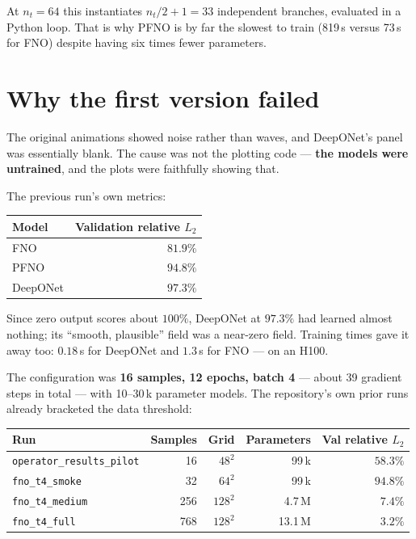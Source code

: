 \documentclass[11pt,a4paper]{article}
\newcommand{\relL}{relative $L_2$}
\begin{document}
At $n_t=64$ this instantiates $n_t/2+1=33$ independent branches, evaluated in a
Python loop. That is why PFNO is by far the slowest to train (819\,s versus
73\,s for FNO) despite having six times fewer parameters.

\section{Why the first version failed}

The original animations showed noise rather than waves, and DeepONet's panel was
essentially blank. The cause was not the plotting code --- \textbf{the models
were untrained}, and the plots were faithfully showing that.

The previous run's own metrics:

\begin{center}
\small
\begin{tabular}{lr}
\toprule
\textbf{Model} & \textbf{Validation \relL{}}\\
\midrule
FNO      & $81.9\%$\\
PFNO     & $94.8\%$\\
DeepONet & $97.3\%$\\
\bottomrule
\end{tabular}
\end{center}

Since zero output scores about $100\%$, DeepONet at $97.3\%$ had learned almost
nothing; its ``smooth, plausible'' field was a near-zero field. Training times
gave it away too: $0.18$\,s for DeepONet and $1.3$\,s for FNO --- on an H100.

The configuration was \textbf{16 samples, 12 epochs, batch 4} --- about 39
gradient steps in total --- with 10--30\,k parameter models. The repository's own
prior runs already bracketed the data threshold:

\begin{center}
\small
\begin{tabular}{lrrrr}
\toprule
\textbf{Run} & \textbf{Samples} & \textbf{Grid} & \textbf{Parameters} & \textbf{Val \relL{}}\\
\midrule
\texttt{operator\_results\_pilot} & 16  & $48^2$  & 99\,k   & $58.3\%$\\
\texttt{fno\_t4\_smoke}           & 32  & $64^2$  & 99\,k   & $94.8\%$\\
\texttt{fno\_t4\_medium}          & 256 & $128^2$ & 4.7\,M  & $7.4\%$\\
\texttt{fno\_t4\_full}            & 768 & $128^2$ & 13.1\,M & $3.2\%$\\
\bottomrule
\end{tabular}
\end{center}
\end{document}
